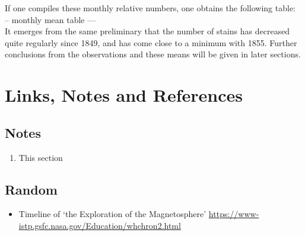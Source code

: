 \documentclass[12pt]{article}
\begin{document}
If one compiles these monthly relative numbers, one obtains the following table:\\

-- monthly mean table ---\\

It emerges from the same preliminary that the number of stains has decreased quite regularly since 1849, and has come close to a minimum with 1855. Further conclusions from the observations and these means will be given in later sections.\\



\section{Links, Notes and References}

\subsection{Notes}
\begin{enumerate}
    \item This section 
\end{enumerate}

\subsection{Random}

\begin{itemize}
    \item Timeline of `the Exploration of the Magnetosphere' \href{https://www-istp.gsfc.nasa.gov/Education/whchron2.html}{https://www-istp.gsfc.nasa.gov/Education/whchron2.html}
\end{itemize}
\end{document}
